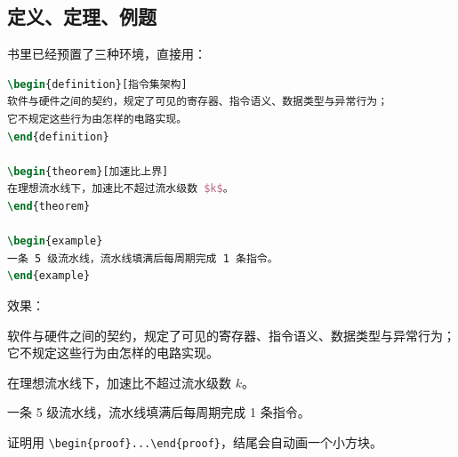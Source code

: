 \subsection{定义、定理、例题}

书里已经预置了三种环境，直接用：

\begin{lstlisting}[language=TeX]
\begin{definition}[指令集架构]
软件与硬件之间的契约，规定了可见的寄存器、指令语义、数据类型与异常行为；
它不规定这些行为由怎样的电路实现。
\end{definition}

\begin{theorem}[加速比上界]
在理想流水线下，加速比不超过流水级数 $k$。
\end{theorem}

\begin{example}
一条 5 级流水线，流水线填满后每周期完成 1 条指令。
\end{example}
\end{lstlisting}

效果：

\begin{definition}[指令集架构]
软件与硬件之间的契约，规定了可见的寄存器、指令语义、数据类型与异常行为；
它不规定这些行为由怎样的电路实现。
\end{definition}

\begin{theorem}[加速比上界]
在理想流水线下，加速比不超过流水级数 $k$。
\end{theorem}

\begin{example}
一条 5 级流水线，流水线填满后每周期完成 1 条指令。
\end{example}

证明用 \verb|\begin{proof}...\end{proof}|，结尾会自动画一个小方块。
